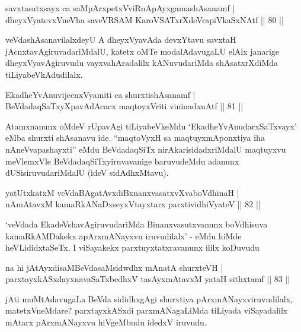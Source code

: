 \begin{shl}
savxtasatxsayx ca saMpArxpetxVviRnA\s pAyxgamashAsanamf  | \\
dheyxVyatevxVneVha saveVRSAM KaroVSATxrXdeVrapiVkaSxNAtf \hfill||  80 ||  
\end{shl}

\begin{artha}
veVdashAsanavilalxdeyU A dheyxVyavAda devxYtavu savxtaH jAcnxtavAgiruvadariMdalU, katetx oMTe modalAdavugaLU elAlx janarige dheyxVyavAgiruvudu vayxvahAradalilx kANuvudariMda shAsatxrXdiMda tiLiyabeVkAdudilalx.
\end{artha}

\begin{shl}
EkadheYvAnuvijecnxVyamiti ca shurxtishAsanamf  | \\
BeVdadaqSaTxyXpavAdAcacx maqtoyxVriti vininadxnAtf \hfill||  81 ||  
\end{shl}

\begin{artha}
Atamxnanunx oMdeV rUpavAgi tiLiyabeVkeMdu `EkadheYvAnudarxSaTxvayx' eMba shurxti shAsanavu ide. ``maqtoVyxH sa maqtuyxmAponxtiya iha nAneVvapashayxti'' eMdu BeVdadaqSiTx nirAkarisidadxriMdalU maqtuyxvu meVlemxVle BeVdadaqSiTxyiruvavanige baruvudeMdu adanunx dUSisiruvudariMdalU (ideV sidAdhxMtavu).
\end{artha}


\begin{shl}
yatUtxkatxM veVdaBAgatAvxdiBxnanxvasatxvXvaboVdhinaH  | \\
nAmAtavxM kamaRkANaDxseyxVtayxtarx parxtividhiVyateV \hfill||  82 ||  
\end{shl}

\begin{artha}
`veVdada EkadeVshavAgiruvudariMda Binanxvasutxvanunx boVdhisuva kamaRkAMDakekx apArxmANayxvu iruvudilalx' - eMdu hiMde heVLididxtaSeTx, I viSayakekx parxtuyxtatxravanunx ililx koDuvudu \mdash 
\end{artha}

\begin{shl}
na hi jAtAyxdisaMBeVdasaMsidwdhx mAnatA shurxteVH  | \\
parxtayxkASxdayxnavaSaTxbedhxV tasAyxmAtavxM yataH sithxtamf \hfill||  83 ||  
\end{shl}

\begin{artha}
jAti muMtAdavugaLa BeVda sididhxgAgi shurxtiya pArxmANayxviruvudilalx, matetxVneMdare? parxtayxkASxdi parxmANagaLiMda tiLiyada viSayadalilx mAtarx pArxmANayxvu hiVgeMbudu idedxV iruvudu.
\end{artha}

